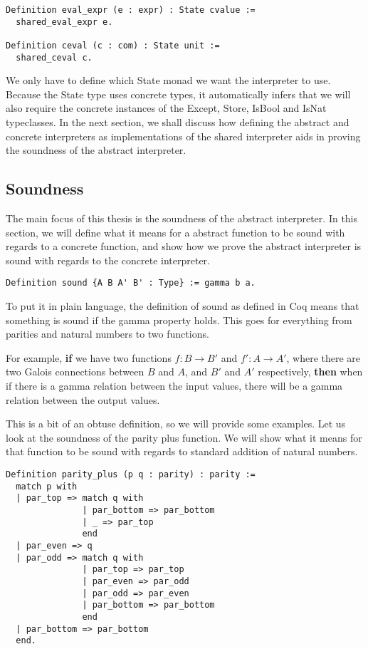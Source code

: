 \begin{verbatim}
Definition eval_expr (e : expr) : State cvalue :=
  shared_eval_expr e.

Definition ceval (c : com) : State unit :=
  shared_ceval c.
\end{verbatim}

We only have to define which State monad we want the interpreter to use.
Because the State type uses concrete types, it automatically infers that we
will also require the concrete instances of the Except, Store, IsBool and IsNat
typeclasses. In the next section, we shall discuss how defining the abstract
and concrete interpreters as implementations of the shared interpreter aids in
proving the soundness of the abstract interpreter.

\subsection{Soundness}\label{sec:soundness}
The main focus of this thesis is the soundness of the abstract interpreter. In
this section, we will define what it means for a abstract function to be sound
with regards to a concrete function, and show how we prove the abstract 
interpreter is sound with regards to the concrete interpreter. 

\begin{verbatim}
Definition sound {A B A' B' : Type} := gamma b a.
\end{verbatim}

To put it in plain language, the definition of sound as defined in Coq means 
that something is sound if the gamma property holds. This goes for everything
from parities and natural numbers to two functions.

For example, \textbf{if} we have two functions $f : B \rightarrow B'$ and $f' 
: A \rightarrow A'$, where there are two Galois connections 
between $B$ and $A$, and $B'$ and $A'$ respectively, \textbf{then} when if 
there is a gamma relation between the input values, there will be a gamma
relation between the output values.

This is a bit of an obtuse definition, so we will provide some examples. Let us
look at the soundness of the parity plus function. We will show what it
means for that function to be sound with regards to standard addition of
natural numbers.

\begin{verbatim}
Definition parity_plus (p q : parity) : parity :=
  match p with 
  | par_top => match q with
               | par_bottom => par_bottom
               | _ => par_top
               end
  | par_even => q
  | par_odd => match q with
               | par_top => par_top
               | par_even => par_odd
               | par_odd => par_even
               | par_bottom => par_bottom
               end
  | par_bottom => par_bottom
  end.
\end{verbatim}

